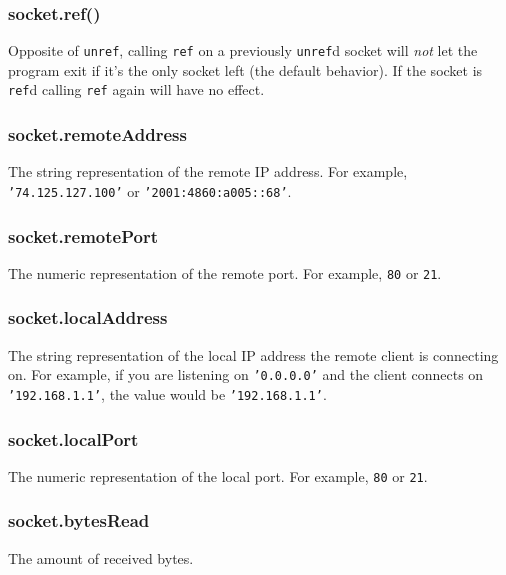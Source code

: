 \subsubsection{socket.ref()}\label{socket.ref}

Opposite of \texttt{unref}, calling \texttt{ref} on a previously
\texttt{unref}d socket will \emph{not} let the program exit if it's the
only socket left (the default behavior). If the socket is \texttt{ref}d
calling \texttt{ref} again will have no effect.

\subsubsection{socket.remoteAddress}\label{socket.remoteaddress}

The string representation of the remote IP address. For example,
\texttt{'74.125.127.100'} or \texttt{'2001:4860:a005::68'}.

\subsubsection{socket.remotePort}\label{socket.remoteport}

The numeric representation of the remote port. For example, \texttt{80}
or \texttt{21}.

\subsubsection{socket.localAddress}\label{socket.localaddress}

The string representation of the local IP address the remote client is
connecting on. For example, if you are listening on \texttt{'0.0.0.0'}
and the client connects on \texttt{'192.168.1.1'}, the value would be
\texttt{'192.168.1.1'}.

\subsubsection{socket.localPort}\label{socket.localport}

The numeric representation of the local port. For example, \texttt{80}
or \texttt{21}.

\subsubsection{socket.bytesRead}\label{socket.bytesread}

The amount of received bytes.


